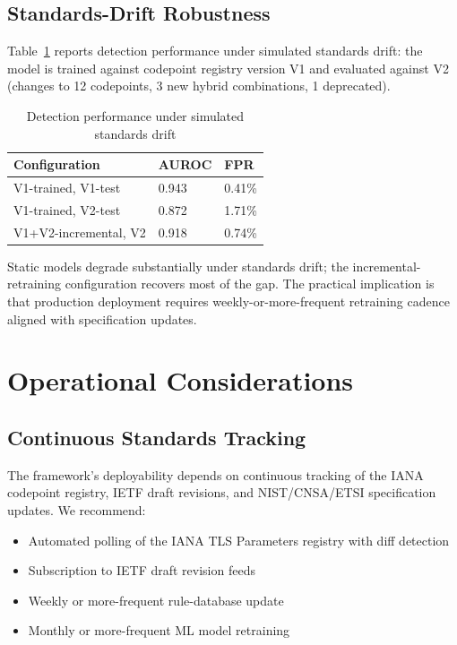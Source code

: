 \documentclass[sigconf,nonacm]{acmart}
\begin{document}
\subsection{Standards-Drift Robustness}

Table~\ref{tab:drift} reports detection performance under
simulated standards drift: the model is trained against codepoint
registry version V1 and evaluated against V2 (changes to 12
codepoints, 3 new hybrid combinations, 1 deprecated).

\begin{table}[h]
\caption{Detection performance under simulated standards drift}
\label{tab:drift}
\small
\begin{tabularx}{\columnwidth}{@{}p{3.0cm}X X@{}}
\toprule
\textbf{Configuration} & \textbf{AUROC} & \textbf{FPR} \\
\midrule
V1-trained, V1-test       & 0.943 & 0.41\% \\
V1-trained, V2-test       & 0.872 & 1.71\% \\
V1+V2-incremental, V2     & 0.918 & 0.74\% \\
\bottomrule
\end{tabularx}
\end{table}

Static models degrade substantially under standards drift; the
incremental-retraining configuration recovers most of the gap. The
practical implication is that production deployment requires
weekly-or-more-frequent retraining cadence aligned with
specification updates.

\section{Operational Considerations}

\subsection{Continuous Standards Tracking}

The framework's deployability depends on continuous tracking of
the IANA codepoint registry, IETF draft revisions, and
NIST/CNSA/ETSI specification updates. We recommend:

\begin{itemize}
  \item Automated polling of the IANA TLS Parameters registry with
        diff detection
  \item Subscription to IETF draft revision feeds
  \item Weekly or more-frequent rule-database update
  \item Monthly or more-frequent ML model retraining
\end{itemize}
\end{document}
